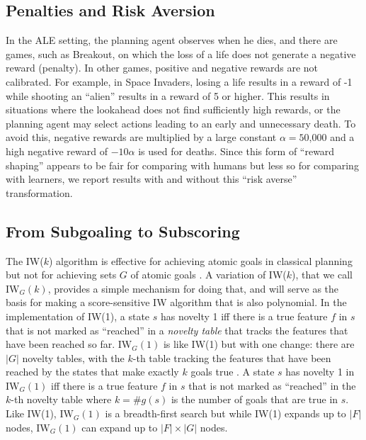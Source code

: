 \documentclass[letterpaper]{article}
\begin{document}
\subsection{Penalties and Risk Aversion}

In the ALE setting, the planning agent observes when he dies, and there are games, such as
Breakout, on which the loss of a life does not generate a negative reward (penalty).
In other games, positive and negative rewards are not calibrated. For example, in
Space Invaders, losing a life  results in a reward of -1 while shooting
an  ``alien'' results in  a reward  of 5 or higher. This results in  situations
where the lookahead does not find sufficiently high rewards, or the planning agent may select
actions leading to an early and unnecessary death. To avoid this,  negative rewards
are multiplied by a large constant $\alpha=\text{50,000}$ and a high negative reward  of $-10\alpha$ is
used for deaths.  Since this form of ``reward shaping'' appears to be fair for comparing with humans
but less so for comparing with learners, we report results with and without this ``risk averse'' transformation.

\subsection{From Subgoaling to Subscoring}

The IW($k$) algorithm is effective for achieving atomic goals in classical planning but
not for achieving sets $G$ of atomic goals \cite{nir:ecai2012}. A variation of IW($k$),
that we call $\textrm{IW}_G(k)$, provides a simple mechanism for doing that, and will
serve as the basis for making a score-sensitive IW algorithm that is also polynomial.
In the implementation of IW(1), a state $s$ has novelty 1 iff there is a true feature $f$
in $s$ that is not marked as ``reached''  in a \emph{novelty table} that tracks the
features that have been reached so far.
$\textrm{IW}_G(1)$ is like IW(1) but with one change: there are $|G|$ novelty tables,
with the $k$-th table tracking the features that have been reached by the states that
make exactly $k$ goals true \cite{nir:aaai2017}.
A state $s$ has novelty 1 in $\textrm{IW}_G(1)$ iff there is a true feature $f$ in $s$
that is not marked as ``reached'' in the $k$-th novelty table where  $k=\#g(s)$ is the
number of goals that are true in $s$.
Like IW(1), $\textrm{IW}_G(1)$ is a breadth-first search but while IW(1) expands up to
$|F|$ nodes,  $\textrm{IW}_G(1)$ can expand up to $|F| \times |G|$ nodes. 
\end{document}
